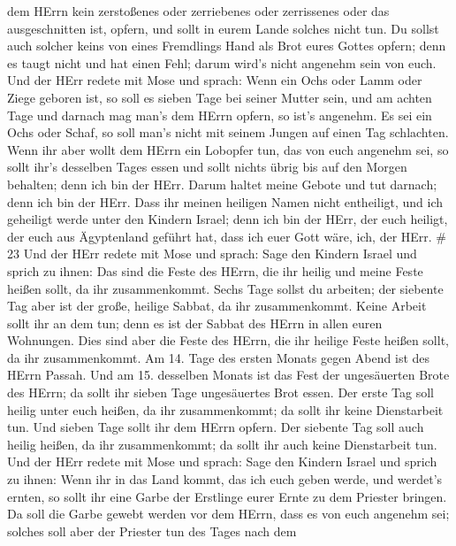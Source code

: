 dem HErrn kein zerstoßenes oder zerriebenes oder zerrissenes oder das
ausgeschnitten ist, opfern, und sollt in eurem Lande solches nicht tun.
 Du sollst auch solcher keins von eines Fremdlings Hand als
Brot eures Gottes opfern; denn es taugt nicht und hat einen Fehl; darum
wird's nicht angenehm sein von euch.  Und der HErr redete
mit Mose und sprach:  Wenn ein Ochs oder Lamm oder Ziege
geboren ist, so soll es sieben Tage bei seiner Mutter sein, und am
achten Tage und darnach mag man's dem HErrn opfern, so ist's angenehm.
 Es sei ein Ochs oder Schaf, so soll man's nicht mit seinem
Jungen auf einen Tag schlachten.  Wenn ihr aber wollt dem
HErrn ein Lobopfer tun, das von euch angenehm sei,  so
sollt ihr's desselben Tages essen und sollt nichts übrig bis auf den
Morgen behalten; denn ich bin der HErr.  Darum haltet meine
Gebote und tut darnach; denn ich bin der HErr.  Dass ihr
meinen heiligen Namen nicht entheiligt, und ich geheiligt werde unter
den Kindern Israel; denn ich bin der HErr, der euch heiligt,
 der euch aus Ägyptenland geführt hat, dass ich euer Gott
wäre, ich, der HErr. \# 23  Und der HErr redete mit Mose und
sprach:  Sage den Kindern Israel und sprich zu ihnen: Das
sind die Feste des HErrn, die ihr heilig und meine Feste heißen sollt,
da ihr zusammenkommt.  Sechs Tage sollst du arbeiten; der
siebente Tag aber ist der große, heilige Sabbat, da ihr zusammenkommt.
Keine Arbeit sollt ihr an dem tun; denn es ist der Sabbat des HErrn in
allen euren Wohnungen.  Dies sind aber die Feste des HErrn,
die ihr heilige Feste heißen sollt, da ihr zusammenkommt. 
Am 14. Tage des ersten Monats gegen Abend ist des HErrn Passah.
 Und am 15. desselben Monats ist das Fest der ungesäuerten
Brote des HErrn; da sollt ihr sieben Tage ungesäuertes Brot essen.
 Der erste Tag soll heilig unter euch heißen, da ihr
zusammenkommt; da sollt ihr keine Dienstarbeit tun.  Und
sieben Tage sollt ihr dem HErrn opfern. Der siebente Tag soll auch
heilig heißen, da ihr zusammenkommt; da sollt ihr auch keine
Dienstarbeit tun.  Und der HErr redete mit Mose und sprach:
 Sage den Kindern Israel und sprich zu ihnen: Wenn ihr in
das Land kommt, das ich euch geben werde, und werdet's ernten, so sollt
ihr eine Garbe der Erstlinge eurer Ernte zu dem Priester bringen.
 Da soll die Garbe gewebt werden vor dem HErrn, dass es von
euch angenehm sei; solches soll aber der Priester tun des Tages nach dem
